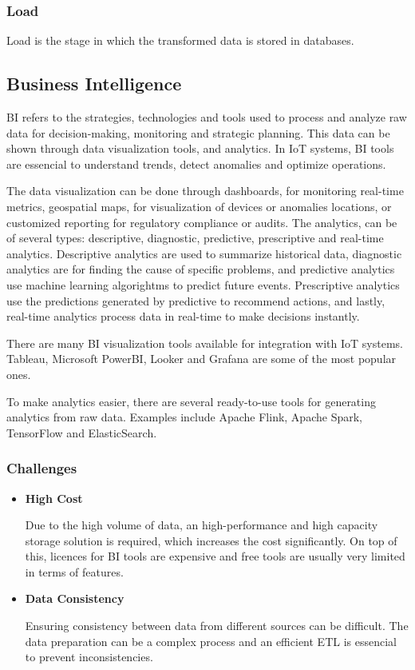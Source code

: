 \subsubsection{Load}
Load is the stage in which the transformed data is stored in databases.

\subsection{Business Intelligence}
\gls{BI} refers to the strategies, technologies and tools used to process and
analyze raw data for decision-making, monitoring and strategic planning.
This data can be shown through data visualization tools, and analytics.
In \gls{IoT} systems, \gls{BI} tools are essencial to understand trends, detect
anomalies and optimize operations.

The data visualization can be done through dashboards, for monitoring real-time
metrics, geospatial maps, for visualization of devices or anomalies locations,
or customized reporting for regulatory compliance or audits. The analytics, can
be of several types: descriptive, diagnostic, predictive, prescriptive and
real-time analytics. Descriptive analytics are used to summarize historical
data, diagnostic analytics are for finding the cause of specific problems, and
predictive analytics use machine learning algorightms to predict future events.
Prescriptive analytics use the predictions generated by predictive to recommend
actions, and lastly, real-time analytics process data in real-time to make
decisions instantly.

There are many \gls{BI} visualization tools available for integration with \gls{IoT} systems.
Tableau, Microsoft PowerBI, Looker and Grafana are some of the most popular ones.

To make analytics easier, there are several ready-to-use tools for generating
analytics from raw data. Examples include Apache Flink, Apache Spark,
TensorFlow and ElasticSearch.
\subsubsection{Challenges}

\begin{itemize}
	\item \textbf{High Cost}

	      Due to the high volume of data, an high-performance and high capacity storage
	      solution is required, which increases the cost significantly. On top of this,
	      licences for \gls{BI} tools are expensive and free tools are usually very
	      limited in terms of features.

	\item \textbf{Data Consistency}

	      Ensuring consistency between data from different sources can be difficult.
	      The data preparation can be a complex process and an efficient \gls{ETL} is
	      essencial to prevent inconsistencies.

\end{itemize}


